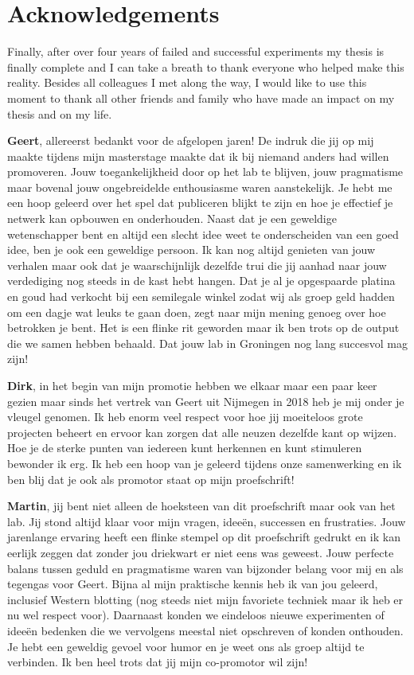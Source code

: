 \cleartoleftpage

\section{Acknowledgements}

Finally, after over four years of failed and successful experiments my thesis is finally complete and I can take a breath to thank everyone who helped make this reality. Besides all colleagues I met along the way, I would like to use this moment to thank all other friends and family who have made an impact on my thesis and on my life.

\textbf{Geert}, allereerst bedankt voor de afgelopen jaren! De indruk die jij op mij maakte tijdens mijn masterstage maakte dat ik bij niemand anders had willen promoveren. Jouw toegankelijkheid door op het lab te blijven, jouw pragmatisme maar bovenal jouw ongebreidelde enthousiasme waren aanstekelijk. Je hebt me een hoop geleerd over het spel dat publiceren blijkt te zijn en hoe je effectief je netwerk kan opbouwen en onderhouden. Naast dat je een geweldige wetenschapper bent en altijd een slecht idee weet te onderscheiden van een goed idee, ben je ook een geweldige persoon. Ik kan nog altijd genieten van jouw verhalen maar ook dat je waarschijnlijk dezelfde trui die jij aanhad naar jouw verdediging nog steeds in de kast hebt hangen. Dat je al je opgespaarde platina en goud had verkocht bij een semilegale winkel zodat wij als groep geld hadden om een dagje wat leuks te gaan doen, zegt naar mijn mening genoeg over hoe betrokken je bent. Het is een flinke rit geworden maar ik ben trots op de output die we samen hebben behaald. Dat jouw lab in Groningen nog lang succesvol mag zijn!

\textbf{Dirk}, in het begin van mijn promotie hebben we elkaar maar een paar keer gezien maar sinds het vertrek van Geert uit Nijmegen in 2018 heb je mij onder je vleugel genomen. Ik heb enorm veel respect voor hoe jij moeiteloos grote projecten beheert en ervoor kan zorgen dat alle neuzen dezelfde kant op wijzen. Hoe je de sterke punten van iedereen kunt herkennen en kunt stimuleren bewonder ik erg. Ik heb een hoop van je geleerd tijdens onze samenwerking en ik ben blij dat je ook als promotor staat op mijn proefschrift!

\textbf{Martin}, jij bent niet alleen de hoeksteen van dit proefschrift maar ook van het lab. Jij stond altijd klaar voor mijn vragen, ideeën, successen en frustraties. Jouw jarenlange ervaring heeft een flinke stempel op dit proefschrift gedrukt en ik kan eerlijk zeggen dat zonder jou driekwart er niet eens was geweest. Jouw perfecte balans tussen geduld en pragmatisme waren van bijzonder belang voor mij en als tegengas voor Geert. Bijna al mijn praktische kennis heb ik van jou geleerd, inclusief Western blotting (nog steeds niet mijn favoriete techniek maar ik heb er nu wel respect voor). Daarnaast konden we eindeloos nieuwe experimenten of ideeën bedenken die we vervolgens meestal niet opschreven of konden onthouden. Je hebt een geweldig gevoel voor humor en je weet ons als groep altijd te verbinden. Ik ben heel trots dat jij mijn co-promotor wil zijn!

